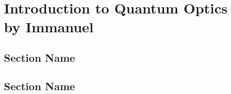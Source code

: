 \documentclass[../../note.tex]{subfiles}
\begin{document}
\chapter{Introduction to Quantum Optics by Immanuel}

\section{Section Name}

\section{Section Name}
\end{document}
